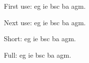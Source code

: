 \documentclass{article}
\begin{document}
First use: \gls{eg} \gls{ie} \gls{bsc} \gls{ba} \gls{agm}.

Next use: \gls{eg} \gls{ie} \gls{bsc} \gls{ba} \gls{agm}.

Short: \acrshort{eg} \acrshort{ie} \acrshort{bsc} \acrshort{ba}
\acrshort{agm}.

Full: \acrfull{eg} \acrfull{ie} \acrfull{bsc} \acrfull{ba}
\acrfull{agm}.

\printglossaries
\end{document}
